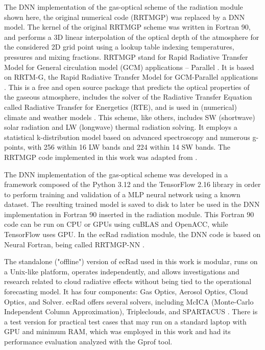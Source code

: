 The DNN implementation of the gas-optical scheme of the radiation module shown here, the original numerical code (RRTMGP) was replaced by a DNN model. The kernel of the original RRTMGP scheme was written in Fortran 90, and performs a 3D linear interpolation of the optical depth of the atmosphere for the considered 2D grid point using a lookup table indexing temperatures, pressures and mixing fractions. RRTMGP stand for Rapid Radiative Transfer Model for General circulation model (GCM) applications – Parallel \cite{Pincus2019}. It is based on RRTM-G, the Rapid Radiative Transfer Model for GCM-Parallel applications \cite{Hogan2017}. This is a free and open source package that predicts the optical properties of the gaseous atmosphere, includes the solver of the Radiative Transfer Equation called Radiative Transfer for Energetics (RTE), and is used in (numerical) climate and weather models \cite{Pincus2019}. This scheme, like others, includes SW (shortwave) solar radiation and LW (longwave) thermal radiation solving. It employs a statistical k-distribution model based on advanced spectroscopy and numerous g-points, with 256 within 16 LW bands and 224 within 14 SW bands. The RRTMGP code implemented in this work was adapted from . 

The DNN implementation of the gas-optical scheme was developed in a framework composed of the Python 3.12 and the TensorFlow 2.16 library in order to perform training and validation of a MLP neural network using a known dataset. The resulting trained model is saved to disk to later be used in the DNN implementation in Fortran 90 inserted in the radiation module. This Fortran 90 code can be run on CPU or GPUs using cuBLAS and OpenACC, while TensorFlow uses GPU. In the ecRad radiation module, the DNN code is based on Neural Fortran, being called RRTMGP-NN . 

The standalone ("offline") version of ecRad used in this work is modular, runs on a Unix-like platform, operates independently, and allows investigations and research related to cloud radiative effects without being tied to the operational forecasting model.  It has four components: Gas Optics, Aerosol Optics, Cloud Optics, and Solver. ecRad offers several solvers, including McICA (Monte-Carlo Independent Column Approximation), Tripleclouds, and SPARTACUS \cite{Ukkonen2023}. There is a test version for practical test cases that may run on a standard laptop with GPU and minimum RAM, which was employed in this work and had its performance evaluation analyzed with the Gprof tool.

